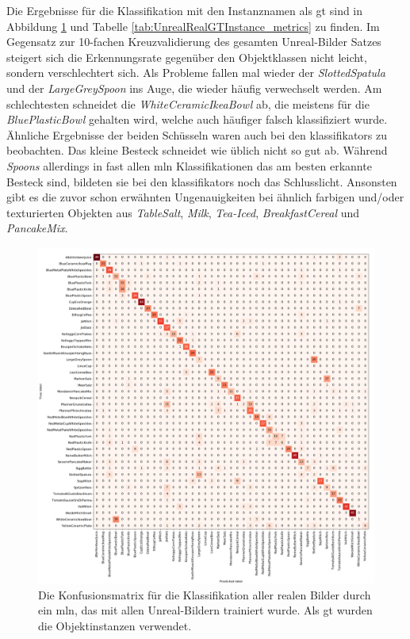 Die Ergebnisse für die Klassifikation mit den Instanznamen als \gls{gt} sind in Abbildung \ref{fig:UnrealRealGTInstance_confMatrix} und Tabelle \ref{tab:UnrealRealGTInstance_metrics} zu finden. Im Gegensatz zur 10-fachen Kreuzvalidierung des gesamten Unreal-Bilder Satzes steigert sich die Erkennungsrate gegenüber den Objektklassen nicht leicht, sondern verschlechtert sich. Als Probleme fallen mal wieder der \textit{SlottedSpatula} und der \textit{LargeGreySpoon} ins Auge, die wieder häufig verwechselt werden. Am schlechtesten schneidet die \textit{WhiteCeramicIkeaBowl} ab, die meistens für die \textit{BluePlasticBowl} gehalten wird, welche auch häufiger falsch klassifiziert wurde. Ähnliche Ergebnisse der beiden Schüsseln waren auch bei den \glspl{klassifikator} zu beobachten. Das kleine Besteck schneidet wie üblich nicht so gut ab. Während \textit{Spoons} allerdings in fast allen \gls{mln} Klassifikationen das am besten erkannte Besteck sind, bildeten sie bei den \glspl{klassifikator} noch das Schlusslicht. Ansonsten gibt es die zuvor schon erwähnten Ungenauigkeiten bei ähnlich farbigen und/oder texturierten Objekten aus \textit{TableSalt}, \textit{Milk}, \textit{Tea-Iced}, \textit{BreakfastCereal} und \textit{PancakeMix}. \par

\begin{figure}
\centering
	\includegraphics[scale=.292]{img/chapter6/UnrealRealGTInstance.png}
\caption[Konfusionsmatrix der Objektinstanzen Klassifikation mit Unreal-Trainingsset und realem Testset]{Die Konfusionsmatrix für die Klassifikation aller realen Bilder durch ein \gls{mln}, das mit allen Unreal-Bildern trainiert wurde. Als \gls{gt} wurden die Objektinstanzen verwendet.}
\label{fig:UnrealRealGTInstance_confMatrix}
\end{figure} 

